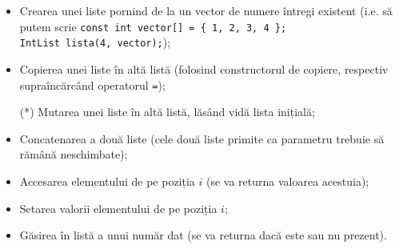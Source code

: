 \begin{enumerate}
\begin{itemize}
        \item Crearea unei liste pornind de la un vector de numere întregi existent (i.e. să putem scrie 
        \texttt{const int vector[] = \{ 1, 2, 3, 4 \};}\\
        \texttt{IntList lista(4, vector);});

        \item Copierea unei liste în altă listă (folosind constructorul de copiere, respectiv supraîncărcând operatorul \texttt{=});
        
        \item[(*)] Mutarea unei liste în altă listă, lăsând vidă lista inițială;
    
        \item Concatenarea a două liste (cele două liste primite ca parametru trebuie să rămână neschimbate);

        \item Accesarea elementului de pe poziția \(i\) (se va returna valoarea acestuia);

        \item Setarea valorii elementului de pe poziția \(i\);

        \item Găsirea în listă a unui număr dat (se va returna dacă este sau nu prezent).
    \end{itemize}
\end{enumerate}